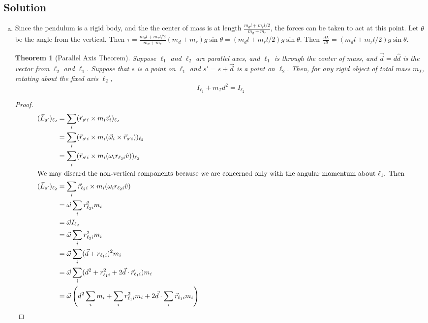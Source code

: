 \documentclass[solutions]{esg8012pset}
\renewcommand{\d}{\,d}
\newtheorem{thm}{Theorem}[section]
\begin{document}
\subsection{Solution}
  \begin{enumerate}[(a)]
    \item Since the pendulum is a rigid body, and the the center of mass is at length $\frac{m_d l + m_r l / 2}{m_d + m_r}$, the forces can be taken to act at this point.  Let $\theta$ be the angle from the vertical.  Then $\tau = \frac{m_d l + m_r l / 2}{m_d + m_r} (m_d + m_r)g\sin\theta = (m_d l + m_r l / 2)g\sin\theta$.  Then $\frac{\d L}{\d t} = (m_d l + m_r l / 2)g\sin\theta$.
    \begin{thm}[Parallel Axis Theorem]
    Suppose $\ell_1$ and $\ell_2$ are parallel axes, and $\ell_1$ is through the center of mass, and $\vec d = d\hat d$ is the vector from $\ell_2$ and $\ell_1$.  Suppose that $s$ is a point on $\ell_1$ and $s' = s + \vec d$ is a point on $\ell_2$.  Then, for any rigid object of total mass $m_T$, rotating about the fixed axis $\ell_2$, \begin{equation} I_{\ell_1} + m_T d^2 = I_{\ell_2} \end{equation}
    \end{thm}
    \begin{proof}
      \begin{align*}
        (\vec L_{s'})_{\ell_2} & = \sum_i (\vec r_{s'i} \times m_i\vec v_i)_{\ell_2} \\
        & = \sum_i (\vec r_{s'i} \times m_i(\vec \omega_i \times \vec r_{s'i}))_{\ell_2} \\
        & = \sum_i (\vec r_{s'i} \times m_i(\omega_i r_{\ell_2 i} \hat v))_{\ell_2} \\
  \intertext{We may discard the non-vertical components because we are concerned only with the angular momentum about $\ell_1$.  Then}
        (\vec L_{s'})_{\ell_2} & = \sum_i \vec r_{\ell_2 i} \times m_i(\omega_i r_{\ell_2 i} \hat v) \\
        & = \vec \omega \sum_i \vec r_{\ell_2 i}^2 m_i \\
        & = \vec \omega I_{\ell_2} \\
        & = \vec \omega \sum_i r_{\ell_2 i}^2 m_i \\
        & = \vec \omega \sum_i (\vec d + r_{\ell_1 i})^2 m_i \\
        & = \vec \omega \sum_i (d^2 + r_{\ell_1 i}^2 + 2\vec d \cdot \vec r_{\ell_1 i}) m_i \\
        & = \vec \omega \left( d^2 \sum_i m_i +  \sum_i r_{\ell_1 i}^2 m_i + 2\vec d \cdot \sum_i \vec r_{\ell_1 i} m_i \right) \\

\end{align*}
\end{proof}
\end{enumerate}
\end{document}
